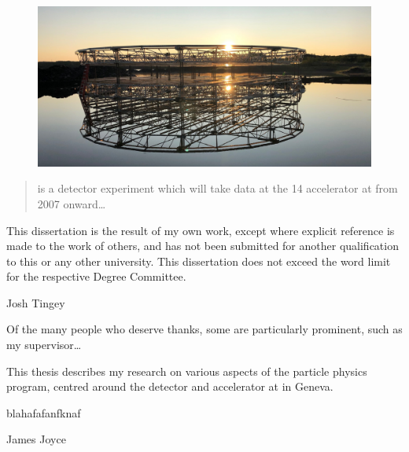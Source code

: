 
\begin{figure}
    \includegraphics[width=\largefigwidth]{diagrams/4-chips/sunrise}
\end{figure}

\begin{abstract}%
    \LHCb is a \bphysics detector experiment which will take data at
    the \unit{14}{\TeV} \LHC accelerator at \CERN from 2007 onward\dots
\end{abstract}


\begin{declaration}
    This dissertation is the result of my own work, except where explicit
    reference is made to the work of others, and has not been submitted
    for another qualification to this or any other university. This
    dissertation does not exceed the word limit for the respective Degree
    Committee.
    \vspace*{1cm}
    \begin{flushright}
        Josh Tingey
    \end{flushright}
\end{declaration}


\begin{acknowledgements}
    Of the many people who deserve thanks, some are particularly prominent,
    such as my supervisor\dots
\end{acknowledgements}


\begin{preface}
    This thesis describes my research on various aspects of the \LHCb
    particle physics program, centred around the \LHCb detector and \LHC
    accelerator at \CERN in Geneva.

    \noindent
    blahafafanfknaf
\end{preface}

\tableofcontents

%
{James Joyce}
\thispagestyle{empty}

